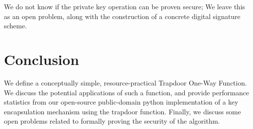 \documentclass[preprint]{iacrtrans}
\begin{document}
We do not know if the private key operation can be proven secure; We leave this as an open problem, along with the construction of a concrete digital signature scheme.

\section{Conclusion}
We define a conceptually simple, resource-practical Trapdoor One-Way Function. We discuss the potential applications of such a function, and provide performance statistics from our open-source public-domain python implementation of a key encapsulation mechanism using the trapdoor function. Finally, we discuss some open problems related to formally proving the security of the algorithm.
\end{document}
